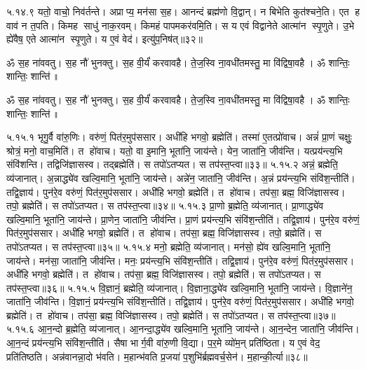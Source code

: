 ५.१४.९
यतो॒ वाचो॒ निव॑र्तन्ते। अप्राप्य॒ मन॑सा स॒ह। आनन्दं ब्रह्म॑णो वि॒द्वान्। न बिभेति कुत॑श्चने॒ति। एत ह वाव॑ न त॒पति। किमह साधु॑ नाक॒रवम्। किमहं पापमकर॑वमि॒ति। स य एवं  विद्वानेते आत्मा॑न स्पृ॒णुते। उ॒भे ह्ये॑वैष॒ एते आत्मा॑न स्पृ॒णुते। य ए॒वं वेद॑। इत्यु॑प॒निष॑त्॥३२॥

ॐ स॒ह ना॑ववतु। स॒ह नौ॑ भुनक्तु। स॒ह वी॒र्यं॑ करवावहै। ते॒ज॒स्वि ना॒वधी॑तमस्तु॒ मा वि॑द्विषा॒वहै। ॐ शान्तिः॒ शान्तिः॒ शान्ति॑॥

\closesection
\clearpage

\setcounter{anuvakam}{0}
ॐ स॒ह ना॑ववतु। स॒ह नौ॑ भुनक्तु। स॒ह वी॒र्यं॑ करवावहै। ते॒ज॒स्वि ना॒वधी॑तमस्तु॒ मा वि॑द्विषा॒वहै। ॐ शान्तिः॒ शान्तिः॒ शान्ति॑॥

५.१५.१
भृगु॒र्वै वा॑रु॒णिः। वरु॑णं॒ पित॑र॒मुप॑ससार। अधी॑हि भगवो॒ ब्रह्मेति॑। तस्मा॑ ए॒तत्प्रो॑वाच। अन्नं॑ प्रा॒णं चक्षुः॒ श्रोत्रं॒ मनो॒ वाच॒मिति॑। त हो॑वाच। यतो॒ वा इ॒मानि॒ भूता॑नि॒ जाय॑न्ते। येन॒ जाता॑नि॒ जीव॑न्ति। यत्प्रय॑न्त्य॒भि संवि॑शन्ति। तद्विजि॑ज्ञासस्व। तद्ब्रह्मेति॑। स तपो॑ऽतप्यत। स तप॑स्त॒प्त्वा॥३३॥
५.१५.२
अन्नं॒ ब्रह्मेति॒ व्य॑जानात्। अ॒न्नाद्ध्ये॑व खल्वि॒मानि॒ भूता॑नि॒ जाय॑न्ते। अन्ने॑न॒ जाता॑नि॒ जीव॑न्ति। अ॒न्नं प्रय॑न्त्य॒भि  संवि॑श॒न्तीति॑। तद्वि॒ज्ञाय॑। पुन॑रे॒व वरु॑णं॒ पित॑र॒मुप॑ससार। अधी॑हि भगवो॒ ब्रह्मेति॑। त हो॑वाच। तप॑सा॒ ब्रह्म॒ विजि॑ज्ञासस्व। तपो॒ ब्रह्मेति॑। स तपो॑ऽतप्यत। स तप॑स्त॒प्त्वा॥३४॥
५.१५.३
प्रा॒णो ब्र॒ह्मेति॒ व्य॑जानात्। प्रा॒णाद्ध्ये॑व खल्वि॒मानि॒ भूता॑नि॒ जाय॑न्ते। प्रा॒णेन॒ जाता॑नि॒ जीव॑न्ति। प्रा॒णं प्रय॑न्त्य॒भि  संवि॑श॒न्तीति॑। तद्वि॒ज्ञाय॑। पुन॑रे॒व वरु॑णं॒ पित॑र॒मुप॑ससार। अधी॑हि भगवो॒ ब्रह्मेति॑। त हो॑वाच। तप॑सा॒ ब्रह्म॒ विजि॑ज्ञासस्व। तपो॒ ब्रह्मेति॑। स तपो॑ऽतप्यत। स तप॑स्त॒प्त्वा॥३५॥
५.१५.४
मनो॒ ब्रह्मेति॒ व्य॑जानात्। मन॑सो॒ ह्ये॑व खल्वि॒मानि॒ भूता॑नि॒ जाय॑न्ते। मन॑सा॒ जाता॑नि॒ जीव॑न्ति। मनः॒ प्रय॑न्त्य॒भि  संवि॑श॒न्तीति॑। तद्वि॒ज्ञाय॑। पुन॑रे॒व वरु॑णं॒ पित॑र॒मुप॑ससार। अधी॑हि भगवो॒ ब्रह्मेति॑। त हो॑वाच। तप॑सा॒ ब्रह्म॒ विजि॑ज्ञासस्व। तपो॒ ब्रह्मेति॑। स तपो॑ऽतप्यत। स तप॑स्त॒प्त्वा॥३६॥
५.१५.५
वि॒ज्ञानं॒ ब्रह्मेति॒ व्य॑जानात्। वि॒ज्ञाना॒द्ध्ये॑व खल्वि॒मानि॒ भूता॑नि॒ जाय॑न्ते। वि॒ज्ञाने॑न॒ जाता॑नि॒ जीव॑न्ति। वि॒ज्ञानं॒ प्रय॑न्त्य॒भि संवि॑श॒न्तीति॑। तद्वि॒ज्ञाय॑। पुन॑रे॒व वरु॑णं॒ पित॑र॒मुप॑ससार। अधी॑हि भगवो॒ ब्रह्मेति॑। त हो॑वाच। तप॑सा॒ ब्रह्म॒ विजि॑ज्ञासस्व। तपो॒ ब्रह्मेति॑। स तपो॑ऽतप्यत। स तप॑स्त॒प्त्वा॥३७॥
५.१५.६
आ॒न॒न्दो ब्र॒ह्मेति॒ व्य॑जानात्। आ॒नन्दा॒द्ध्ये॑व खल्वि॒मानि॒ भूता॑नि॒ जाय॑न्ते। आ॒न॒न्देन॒ जाता॑नि॒ जीव॑न्ति। आ॒न॒न्दं प्रय॑न्त्य॒भि संवि॑श॒न्तीति॑। सैषा भार्ग॒वी वा॑रु॒णी वि॒द्या। प॒र॒मे व्यो॑म॒न् प्रति॑ष्ठिता। य ए॒वं वेद॒ प्रति॑तिष्ठति। अन्न॑वानन्ना॒दो भ॑वति। म॒हान्भ॑वति प्र॒जया॑ प॒शुभि॑र्ब्रह्मवर्च॒सेन॑। म॒हान्की॒र्त्या॥३८॥
